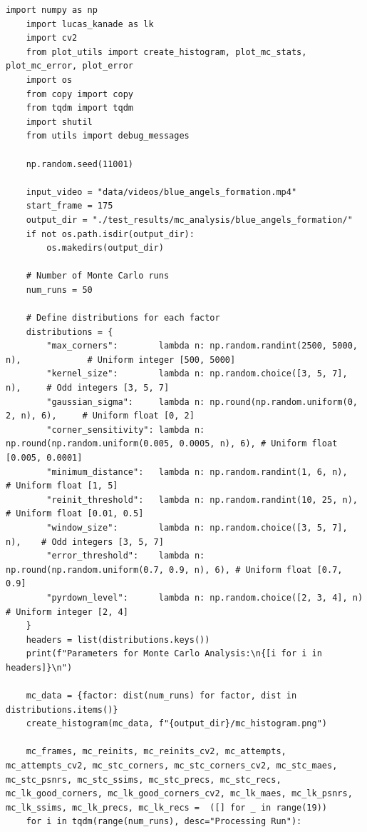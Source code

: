 \documentclass[11pt, conference, letterpaper]{IEEEtran}
\begin{document}
\begin{lstlisting}[style=python, caption={\texttt{monte\_carlo\_analysis.py}}, label={lst:mc}]
    import numpy as np
    import lucas_kanade as lk
    import cv2
    from plot_utils import create_histogram, plot_mc_stats, plot_mc_error, plot_error
    import os
    from copy import copy
    from tqdm import tqdm
    import shutil
    from utils import debug_messages
    
    np.random.seed(11001)
    
    input_video = "data/videos/blue_angels_formation.mp4"
    start_frame = 175
    output_dir = "./test_results/mc_analysis/blue_angels_formation/"
    if not os.path.isdir(output_dir):
        os.makedirs(output_dir)
    
    # Number of Monte Carlo runs
    num_runs = 50
    
    # Define distributions for each factor
    distributions = {
        "max_corners":        lambda n: np.random.randint(2500, 5000, n),             # Uniform integer [500, 5000]
        "kernel_size":        lambda n: np.random.choice([3, 5, 7], n),     # Odd integers [3, 5, 7]
        "gaussian_sigma":     lambda n: np.round(np.random.uniform(0, 2, n), 6),     # Uniform float [0, 2]
        "corner_sensitivity": lambda n: np.round(np.random.uniform(0.005, 0.0005, n), 6), # Uniform float [0.005, 0.0001]
        "minimum_distance":   lambda n: np.random.randint(1, 6, n),                 # Uniform float [1, 5]
        "reinit_threshold":   lambda n: np.random.randint(10, 25, n),                 # Uniform float [0.01, 0.5]
        "window_size":        lambda n: np.random.choice([3, 5, 7], n),    # Odd integers [3, 5, 7]
        "error_threshold":    lambda n: np.round(np.random.uniform(0.7, 0.9, n), 6), # Uniform float [0.7, 0.9]
        "pyrdown_level":      lambda n: np.random.choice([2, 3, 4], n)                   # Uniform integer [2, 4]
    }
    headers = list(distributions.keys())
    print(f"Parameters for Monte Carlo Analysis:\n{[i for i in headers]}\n")
    
    mc_data = {factor: dist(num_runs) for factor, dist in distributions.items()}
    create_histogram(mc_data, f"{output_dir}/mc_histogram.png")
    
    mc_frames, mc_reinits, mc_reinits_cv2, mc_attempts, mc_attempts_cv2, mc_stc_corners, mc_stc_corners_cv2, mc_stc_maes, mc_stc_psnrs, mc_stc_ssims, mc_stc_precs, mc_stc_recs, mc_lk_good_corners, mc_lk_good_corners_cv2, mc_lk_maes, mc_lk_psnrs, mc_lk_ssims, mc_lk_precs, mc_lk_recs =  ([] for _ in range(19))
    for i in tqdm(range(num_runs), desc="Processing Run"):
        

\end{lstlisting}
\end{document}
